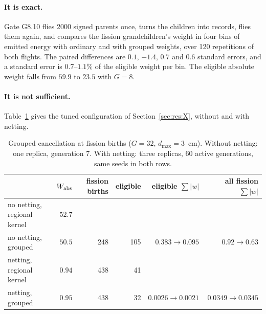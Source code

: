 \paragraph{It is exact.} Gate G8.10 flies 2000 signed parents once, turns the children into
records, flies them again, and compares the fission grandchildren's weight in four bins of emitted
energy with ordinary and with grouped weights, over 120 repetitions of both flights. The paired
differences are $0.1$, $-1.4$, $0.7$ and $0.6$ standard errors, and a standard error is $0.7$--$1.1\%$
of the eligible weight per bin. The eligible absolute weight falls from $59.9$ to $23.5$ with $G=8$.

\paragraph{It is not sufficient.} Table~\ref{tab:res:grouped} gives the tuned configuration of
Section~\ref{sec:res:X}, without and with netting.

\begin{table}[t]\centering\small
\caption{Grouped cancellation at fission births ($G=32$, $d_{\max}=3$~cm). Without netting: one
replica, generation 7. With netting: three replicas, 60 active generations, same seeds in both
rows.}\label{tab:res:grouped}
\begin{tabular}{@{}lrrrrr@{}}
\toprule
 & $W_{\mathrm{abs}}$ & fission births & eligible & eligible $\sum|w|$ & all fission $\sum|w|$\\
\midrule
no netting, regional kernel & $52.7$ & & & & \\
no netting, grouped & $50.5$ & 248 & 105 & $0.383\to0.095$ & $0.92\to0.63$\\
netting, regional kernel & $0.94$ & 438 & 41 & & \\
netting, grouped & $0.95$ & 438 & 32 & $0.0026\to0.0021$ & $0.0349\to0.0345$\\
\bottomrule
\end{tabular}
\end{table}

